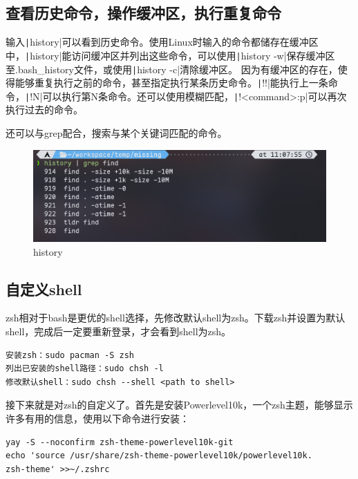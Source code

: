 \documentclass[fontset=ubuntu]{ctexart}
\begin{document}
\begin{sloppypar}
\subsection{查看历史命令，操作缓冲区，执行重复命令}
输入\texttt|history|可以看到历史命令。使用Linux时输入的命令都储存在缓冲区中，\texttt|history|能访问缓冲区并列出这些命令，可以使用\texttt|history -w|保存缓冲区至.bash\_history文件，或使用\texttt|history -c|清除缓冲区。
因为有缓冲区的存在，使得能够重复执行之前的命令，甚至指定执行某条历史命令。\texttt|!!|能执行上一条命令，\texttt|!N|可以执行第N条命令。还可以使用模糊匹配，\texttt|!<command>:p|可以再次执行过去的命令。

还可以与grep配合，搜索与某个关键词匹配的命令。
\begin{figure}[htb]
    \centering
    \includegraphics[width=0.75\linewidth]{History.png}
    \caption{history}
    \label{fig:history}
\end{figure}

\subsection{自定义shell}
zsh相对于bash是更优的shell选择，先修改默认shell为zsh。下载zsh并设置为默认shell，完成后一定要重新登录，才会看到shell为zsh。
\begin{listing}[htb]
\begin{verbatim}
安装zsh：sudo pacman -S zsh
列出已安装的shell路径：sudo chsh -l
修改默认shell：sudo chsh --shell <path to shell>
\end{verbatim}
\end{listing}

接下来就是对zsh的自定义了。首先是安装Powerlevel10k，一个zsh主题，能够显示许多有用的信息，使用以下命令进行安装：
\begin{listing}[htb]
\begin{verbatim}
yay -S --noconfirm zsh-theme-powerlevel10k-git
echo 'source /usr/share/zsh-theme-powerlevel10k/powerlevel10k.
zsh-theme' >>~/.zshrc
\end{verbatim}
\end{listing}


\end{sloppypar}
\end{document}
